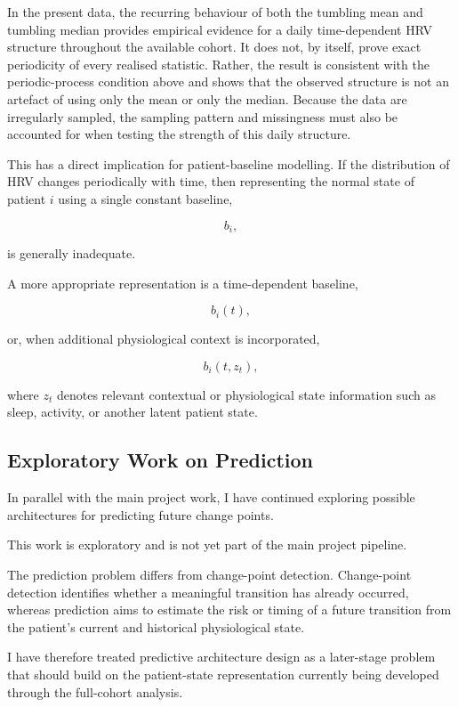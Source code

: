\documentclass[11pt,a4paper]{article}
\begin{document}
In the present data, the recurring behaviour of both the tumbling mean and
tumbling median provides empirical evidence for a daily time-dependent HRV
structure throughout the available cohort. It does not, by itself, prove exact
periodicity of every realised statistic. Rather, the result is consistent with
the periodic-process condition above and shows that the observed structure is
not an artefact of using only the mean or only the median. Because the data are
irregularly sampled, the sampling pattern and missingness must also be
accounted for when testing the strength of this daily structure.

This has a direct implication for patient-baseline modelling. If the distribution of HRV changes periodically with time, then representing the normal state of patient $i$ using a single constant baseline,

\[
b_i,
\]

is generally inadequate.

A more appropriate representation is a time-dependent baseline,

\[
b_i(t),
\]

or, when additional physiological context is incorporated,

\[
b_i(t,z_t),
\]

where $z_t$ denotes relevant contextual or physiological state information such as sleep, activity, or another latent patient state.
\subsection{Exploratory Work on Prediction}

In parallel with the main project work, I have continued exploring possible
architectures for predicting future change points.

This work is exploratory and is not yet part of the main project pipeline.

The prediction problem differs from change-point detection. Change-point
detection identifies whether a meaningful transition has already occurred,
whereas prediction aims to estimate the risk or timing of a future transition
from the patient's current and historical physiological state.

I have therefore treated predictive architecture design as a later-stage
problem that should build on the patient-state representation currently being
developed through the full-cohort analysis.
\end{document}
